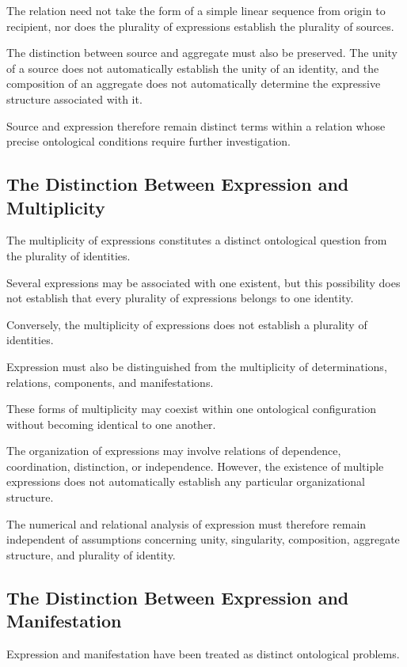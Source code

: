 The relation need not take the form of a simple linear
sequence from origin to recipient, nor does the plurality
of expressions establish the plurality of sources.

The distinction between source and aggregate must
also be preserved. The unity of a source does not
automatically establish the unity of an identity,
and the composition of an aggregate does not
automatically determine the expressive structure
associated with it.

Source and expression therefore remain distinct
terms within a relation whose precise ontological
conditions require further investigation.

\subsection{The Distinction Between Expression and Multiplicity}

The multiplicity of expressions constitutes a distinct
ontological question from the plurality of identities.

Several expressions may be associated with one existent,
but this possibility does not establish that every
plurality of expressions belongs to one identity.

Conversely, the multiplicity of expressions does not
establish a plurality of identities.

Expression must also be distinguished from the multiplicity
of determinations, relations, components, and manifestations.

These forms of multiplicity may coexist within one
ontological configuration without becoming identical
to one another.

The organization of expressions may involve relations
of dependence, coordination, distinction, or independence.
However, the existence of multiple expressions does
not automatically establish any particular organizational
structure.

The numerical and relational analysis of expression
must therefore remain independent of assumptions
concerning unity, singularity, composition, aggregate
structure, and plurality of identity.

\subsection{The Distinction Between Expression and Manifestation}

Expression and manifestation have been treated as
distinct ontological problems.

